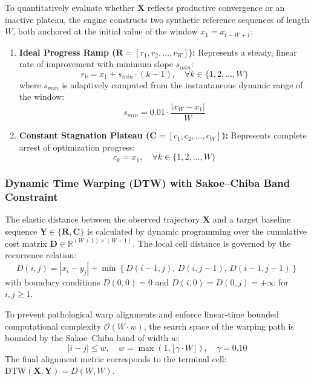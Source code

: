 To quantitatively evaluate whether $\mathbf{X}$ reflects productive convergence or an inactive plateau, the engine constructs two synthetic reference sequences of length $W$, both anchored at the initial value of the window $x_1 = x_{t-W+1}$:

\begin{enumerate}
    \item \textbf{Ideal Progress Ramp ($\mathbf{R} = [r_1, r_2, \dots, r_W]$):} Represents a steady, linear rate of improvement with minimum slope $s_{min}$:
    \begin{equation}
    r_k = x_1 + s_{min} \cdot (k - 1), \quad \forall k \in \{1, 2, \dots, W\}
    \label{eq:ramp_baseline}
    \end{equation}
    where $s_{min}$ is adaptively computed from the instantaneous dynamic range of the window:
    \begin{equation}
    s_{min} = 0.01 \cdot \frac{|x_W - x_1|}{W}
    \label{eq:adaptive_slope}
    \end{equation}

    \item \textbf{Constant Stagnation Plateau ($\mathbf{C} = [c_1, c_2, \dots, c_W]$):} Represents complete arrest of optimization progress:
    \begin{equation}
    c_k = x_1, \quad \forall k \in \{1, 2, \dots, W\}
    \label{eq:constant_baseline}
    \end{equation}
\end{enumerate}

\subsubsection{Dynamic Time Warping (DTW) with Sakoe--Chiba Band Constraint}

The elastic distance between the observed trajectory $\mathbf{X}$ and a target baseline sequence $\mathbf{Y} \in \{\mathbf{R}, \mathbf{C}\}$ is calculated by dynamic programming over the cumulative cost matrix $\mathbf{D} \in \mathbb{R}^{(W+1) \times (W+1)}$. The local cell distance is governed by the recurrence relation:
\begin{equation}
D(i, j) = |x_i - y_j| + \min \left\{ D(i-1, j),\, D(i, j-1),\, D(i-1, j-1) \right\}
\label{eq:dtw_recurrence}
\end{equation}
with boundary conditions $D(0, 0) = 0$ and $D(i, 0) = D(0, j) = +\infty$ for $i, j \ge 1$.

To prevent pathological warp alignments and enforce linear-time bounded computational complexity $\mathcal{O}(W \cdot w)$, the search space of the warping path is bounded by the Sakoe--Chiba band of width $w$:
\begin{equation}
|i - j| \le w, \quad w = \max(1, \lfloor \gamma \cdot W \rfloor), \quad \gamma = 0.10
\label{eq:sakoe_chiba}
\end{equation}
The final alignment metric corresponds to the terminal cell: $\text{DTW}(\mathbf{X}, \mathbf{Y}) = D(W, W)$.

